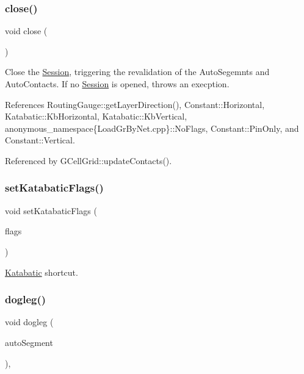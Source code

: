 \subsubsection{\texorpdfstring{close()}{close()}}
{\footnotesize\ttfamily void close (\begin{DoxyParamCaption}{ }\end{DoxyParamCaption})\hspace{0.3cm}{\ttfamily [static]}}

Close the \hyperlink{classKatabatic_1_1Session}{Session}, triggering the revalidation of the Auto\+Segemnts and Auto\+Contacts. If no \hyperlink{classKatabatic_1_1Session}{Session} is opened, throws an execption. 

References Routing\+Gauge\+::get\+Layer\+Direction(), Constant\+::\+Horizontal, Katabatic\+::\+Kb\+Horizontal, Katabatic\+::\+Kb\+Vertical, anonymous\+\_\+namespace\{\+Load\+Gr\+By\+Net.\+cpp\}\+::\+No\+Flags, Constant\+::\+Pin\+Only, and Constant\+::\+Vertical.



Referenced by G\+Cell\+Grid\+::update\+Contacts().

\mbox{\label{classKatabatic_1_1Session_af9919aefa1db2478b3d1813c1872d175}} 
\subsubsection{\texorpdfstring{set\+Katabatic\+Flags()}{setKatabaticFlags()}}
{\footnotesize\ttfamily void set\+Katabatic\+Flags (\begin{DoxyParamCaption}\item[{unsigned int}]{flags }\end{DoxyParamCaption})\hspace{0.3cm}{\ttfamily [static]}}

\hyperlink{namespaceKatabatic}{Katabatic} shortcut. \mbox{\label{classKatabatic_1_1Session_aed01e83f7d8dc7acd85156256a9e776c}} 
\subsubsection{\texorpdfstring{dogleg()}{dogleg()}}
{\footnotesize\ttfamily void dogleg (\begin{DoxyParamCaption}\item[{\hyperlink{classKatabatic_1_1AutoSegment}{Auto\+Segment} $\ast$}]{auto\+Segment }\end{DoxyParamCaption})\hspace{0.3cm}{\ttfamily [inline]}, {\ttfamily [static]}}

